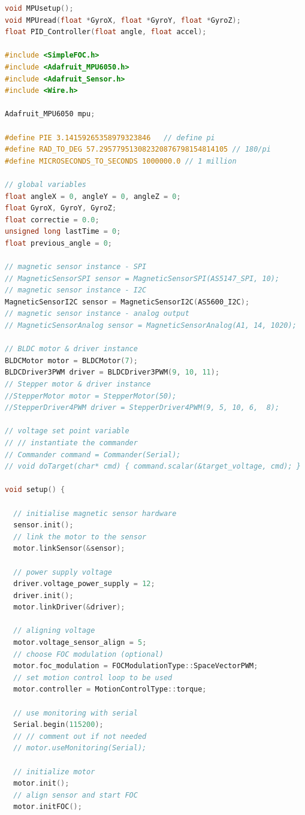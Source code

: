 \documentclass{article}
\begin{document}
\begin{lstlisting}[language=C, caption=Arduino Nano Code]
void MPUsetup();
void MPUread(float *GyroX, float *GyroY, float *GyroZ);
float PID_Controller(float angle, float accel);

#include <SimpleFOC.h>
#include <Adafruit_MPU6050.h>
#include <Adafruit_Sensor.h>
#include <Wire.h>

Adafruit_MPU6050 mpu;

#define PIE 3.14159265358979323846   // define pi
#define RAD_TO_DEG 57.295779513082320876798154814105 // 180/pi
#define MICROSECONDS_TO_SECONDS 1000000.0 // 1 million

// global variables
float angleX = 0, angleY = 0, angleZ = 0;
float GyroX, GyroY, GyroZ;
float correctie = 0.0;
unsigned long lastTime = 0;
float previous_angle = 0;

// magnetic sensor instance - SPI
// MagneticSensorSPI sensor = MagneticSensorSPI(AS5147_SPI, 10);
// magnetic sensor instance - I2C
MagneticSensorI2C sensor = MagneticSensorI2C(AS5600_I2C);
// magnetic sensor instance - analog output
// MagneticSensorAnalog sensor = MagneticSensorAnalog(A1, 14, 1020);

// BLDC motor & driver instance
BLDCMotor motor = BLDCMotor(7);
BLDCDriver3PWM driver = BLDCDriver3PWM(9, 10, 11);
// Stepper motor & driver instance
//StepperMotor motor = StepperMotor(50);
//StepperDriver4PWM driver = StepperDriver4PWM(9, 5, 10, 6,  8);

// voltage set point variable
// // instantiate the commander
// Commander command = Commander(Serial);
// void doTarget(char* cmd) { command.scalar(&target_voltage, cmd); }

void setup() {

  // initialise magnetic sensor hardware
  sensor.init();
  // link the motor to the sensor
  motor.linkSensor(&sensor);

  // power supply voltage
  driver.voltage_power_supply = 12;
  driver.init();
  motor.linkDriver(&driver);

  // aligning voltage 
  motor.voltage_sensor_align = 5;
  // choose FOC modulation (optional)
  motor.foc_modulation = FOCModulationType::SpaceVectorPWM;
  // set motion control loop to be used
  motor.controller = MotionControlType::torque;

  // use monitoring with serial 
  Serial.begin(115200);
  // // comment out if not needed
  // motor.useMonitoring(Serial);

  // initialize motor
  motor.init();
  // align sensor and start FOC
  motor.initFOC();


\end{lstlisting}
\end{document}
